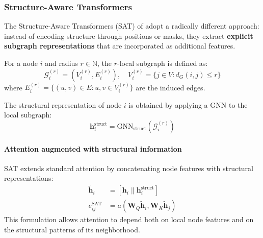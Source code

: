 \subsubsection[Structure-Aware Transformers]{Structure-Aware \glspl{Transformer}}\label{subsubsec:structure_aware_transformers}

The Structure-Aware \glspl{Transformer} (SAT) of \citet{chen2022structureaware} adopt a radically different approach: instead of encoding structure through positions or masks, they extract \textbf{explicit subgraph representations} that are incorporated as additional features.

\begin{definition}\label{def:subgraph_representation_sat}
For a node $i$ and radius $r \in \mathbb{N}$, the $r$-local subgraph is defined as:
\begin{equation}
    \mathcal{G}_i^{(r)} = (V_i^{(r)}, E_i^{(r)}), \quad V_i^{(r)} = \{j \in V : d_G(i,j) \leq r\}
    \label{eq:local_subgraph}
\end{equation}
where $E_i^{(r)} = \{(u,v) \in E : u, v \in V_i^{(r)}\}$ are the induced edges.

The structural representation of node $i$ is obtained by applying a \gls{GNN} to the local subgraph:
\begin{equation}
    \mathbf{h}_i^{\text{struct}} = \text{GNN}_{\text{struct}}(\mathcal{G}_i^{(r)})
    \label{eq:structural_representation_sat}
\end{equation}
\end{definition}

\paragraph{Attention augmented with structural information}

\begin{definition}\label{def:sat_attention}
SAT extends standard attention by concatenating node features with structural representations:
\begin{align}
    \tilde{\mathbf{h}}_i &= [\mathbf{h}_i \| \mathbf{h}_i^{\text{struct}}] \label{eq:sat_augmented_features} \\
    e_{ij}^{\text{SAT}} &= a\left(\mathbf{W}_Q \tilde{\mathbf{h}}_i, \mathbf{W}_K \tilde{\mathbf{h}}_j\right) \label{eq:sat_attention_score}
\end{align}
This formulation allows attention to depend both on local node features and on the structural patterns of its neighborhood.
\end{definition}

